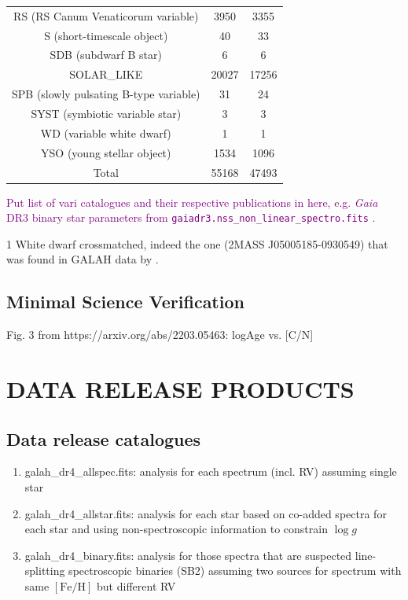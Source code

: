 \documentclass[
  journal=pasa,
  manuscript=research-paper, %
  year=2023,
  volume=37
]{cup-journal}
\newcommand{\SB}[1]{{\textcolor{purple}{#1}}}
\newcommand{\logg}{$\log g$\xspace}
\newcommand{\feh}{$\mathrm{[Fe/H]}$\xspace}
\newcommand{\Gaia}{\textit{Gaia}\xspace}
\begin{document}
\begin{table}
\begin{tabular}{ccc}
RS (RS Canum Venaticorum variable) & 3950 & 3355 \\
S (short-timescale object) & 40 & 33 \\
SDB (subdwarf B star) & 6 & 6 \\
SOLAR\_LIKE & 20027 & 17256 \\
SPB (slowly pulsating B-type variable) & 31 & 24 \\
SYST (symbiotic variable star) & 3 & 3 \\
WD (variable white dwarf) & 1 & 1 \\
YSO (young stellar object) & 1534 & 1096 \\
\hline
Total & 55168 & 47493 \\
\hline
\end{tabular}
\end{table}

\SB{Put list of vari catalogues and their respective publications in here, e.g. \Gaia DR3 binary star parameters from \texttt{gaiadr3.nss\_non\_linear\_spectro.fits} \citep{Halbwachs2023}.
}

1 White dwarf crossmatched, indeed the one (2MASS J05005185-0930549) that was found in GALAH data by \citet{Kawka2020}.

\subsection{Minimal Science Verification}

Fig. 3 from https://arxiv.org/abs/2203.05463: logAge vs. [C/N]

\section{DATA RELEASE PRODUCTS}
\label{sec:catalogues_release_products}

\subsection{Data release catalogues}
\label{sec:data_release_catalogues}

\begin{enumerate}
   \item galah\_dr4\_allspec.fits: analysis for each spectrum (incl. RV) assuming single star
   \item galah\_dr4\_allstar.fits: analysis for each star based on co-added spectra for each star and using non-spectroscopic information to constrain \logg
   \item galah\_dr4\_binary.fits: analysis for those spectra that are suspected line-splitting spectroscopic binaries (SB2) assuming two sources for spectrum with same \feh but different RV
\end{enumerate}
\end{document}
